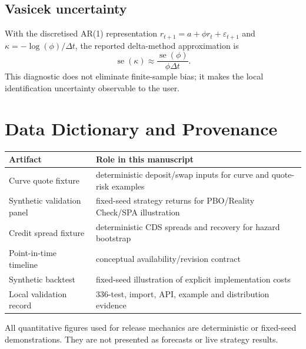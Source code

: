 \documentclass{asrpaper}
\begin{document}
\subsection{Vasicek uncertainty}
With the discretised AR(1) representation $r_{t+1}=a+\phi r_t+\varepsilon_{t+1}$ and $\kappa=-\log(\phi)/\Delta t$, the reported delta-method approximation is
\begin{equation}
\operatorname{se}(\kappa)\approx \frac{\operatorname{se}(\phi)}{\phi\Delta t}.
\end{equation}
This diagnostic does not eliminate finite-sample bias; it makes the local identification uncertainty observable to the user.

\section{Data Dictionary and Provenance}
\begin{center}\fontsize{8.3}{9.7}\selectfont
\begin{tabularx}{\linewidth}{@{}p{.30\linewidth}X@{}}
\toprule
\textbf{Artifact} & \textbf{Role in this manuscript}\\
\midrule
Curve quote fixture & deterministic deposit/swap inputs for curve and quote-risk examples\\
Synthetic validation panel & fixed-seed strategy returns for PBO/Reality Check/SPA illustration\\
Credit spread fixture & deterministic CDS spreads and recovery for hazard bootstrap\\
Point-in-time timeline & conceptual availability/revision contract\\
Synthetic backtest & fixed-seed illustration of explicit implementation costs\\
Local validation record & 336-test, import, API, example and distribution evidence\\
\bottomrule
\end{tabularx}\end{center}

All quantitative figures used for release mechanics are deterministic or fixed-seed demonstrations. They are not presented as forecasts or live strategy results.
\end{document}
